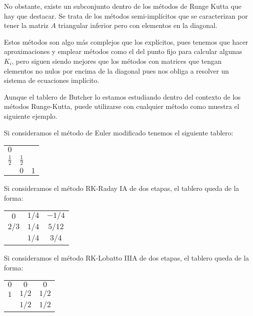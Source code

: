 No obstante, existe un subconjunto dentro de los métodos de Runge Kutta que hay que destacar. Se trata de los métodos semi-implícitos que se caracterizan por tener la matriz $A$ triangular inferior pero con elementos en la diagonal.

Estos métodos son algo más complejos que los explícitos, pues tenemos que hacer aproximaciones y emplear métodos como el del punto fijo para calcular algunas $K_i$, pero siguen siendo mejores que los métodos con matrices que tengan elementos no nulos por encima de la diagonal pues nos obliga a resolver un sistema de ecuaciones implícito.

Aunque el tablero de Butcher lo estamos estudiando dentro del contexto de los métodos Runge-Kutta, puede utilizarse con cualquier método como muestra el siguiente ejemplo.

\begin{example}
Si consideramos el método de Euler modificado tenemos el siguiente tablero:

\begin{center}
\begin{tabular}{c|cc}
$0$ & & \\
$\frac{1}{2}$ & $\frac{1}{2}$ & \\
\hline
 & $0$ & $1$\\
\end{tabular}
\end{center}
\end{example}

\begin{example}
Si consideramos el método RK-Raday IA de dos etapas, el tablero queda de la forma:

\begin{center}
\begin{tabular}{c|cc}
$0$ & $1/4$ & $-1/4$\\
$2/3$ & $1/4 $ & $5/12$ \\
\hline
 & $1/4$ & $3/4$\\
\end{tabular}
\end{center}
\end{example}

\begin{example}
Si consideramos el método RK-Lobatto IIIA de dos etapas, el tablero queda de la forma:

\begin{center}
\begin{tabular}{c|cc}
$0$ & $0$ & $0$\\
$1$ & $1/2 $ & $1/2$ \\
\hline
 & $1/2$ & $1/2$\\
\end{tabular}
\end{center}
\end{example}

